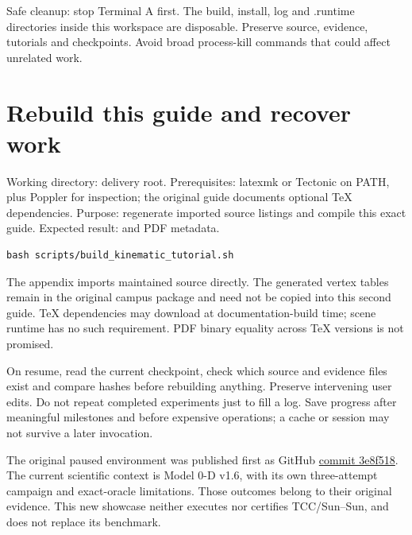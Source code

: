 Safe cleanup: stop Terminal A first. The build, install, log and .runtime directories inside this workspace are disposable. Preserve source, evidence, tutorials and checkpoints. Avoid broad process-kill commands that could affect unrelated work.

\section{Rebuild this guide and recover work}
Working directory: delivery root. Prerequisites: latexmk or Tectonic on PATH, plus Poppler for inspection; the original guide documents optional TeX dependencies. Purpose: regenerate imported source listings and compile this exact guide. Expected result:  and PDF metadata.
\begin{lstlisting}
bash scripts/build_kinematic_tutorial.sh
\end{lstlisting}
The appendix imports maintained source directly. The generated vertex tables remain in the original campus package and need not be copied into this second guide. TeX dependencies may download at documentation-build time; scene runtime has no such requirement. PDF binary equality across TeX versions is not promised.

On resume, read the current checkpoint, check which source and evidence files exist and compare hashes before rebuilding anything. Preserve intervening user edits. Do not repeat completed experiments just to fill a log. Save progress after meaningful milestones and before expensive operations; a cache or session may not survive a later invocation.

The original paused environment was published first as GitHub \href{https://github.com/ismo-idi/CCBO_Model1/commit/3e8f51848bd6057005a782b31da2a25c9c7ca268}{commit 3e8f518}. The current scientific context is Model 0-D v1.6, with its own three-attempt campaign and exact-oracle limitations. Those outcomes belong to their original evidence. This new showcase neither executes nor certifies TCC/Sun--Sun, and does not replace its benchmark.

